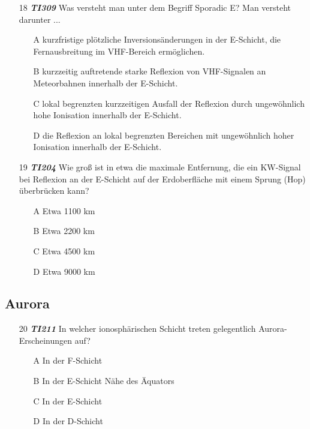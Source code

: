 \begin{enumerate} 
\itemsep1pt\parskip0pt
\item[18] \emph{\textbf{TI309}}   Was versteht man unter dem Begriff Sporadic E? Man versteht darunter ...
	\begin{enumerate}
	\itemsep1pt\parskip0pt
		\item[A] kurzfristige plötzliche Inversionsänderungen in der E-Schicht, die Fernausbreitung im VHF-Bereich ermöglichen.
		\item[B] kurzzeitig auftretende starke Reflexion von VHF-Signalen an Meteorbahnen innerhalb der E-Schicht.
		\item[C] lokal begrenzten kurzzeitigen Ausfall der Reflexion durch ungewöhnlich hohe Ionisation innerhalb der E-Schicht.
		\item[D] die Reflexion an lokal begrenzten Bereichen mit ungewöhnlich hoher Ionisation innerhalb der E-Schicht.
	\end{enumerate}
\end{enumerate}

\begin{enumerate} 
\itemsep1pt\parskip0pt
\item[19] \emph{\textbf{TI204}}  Wie groß ist in etwa die maximale Entfernung, die ein KW-Signal bei Reflexion an der E-Schicht auf der Erdoberfläche mit einem Sprung (Hop) überbrücken kann?
	\begin{enumerate}
	\itemsep1pt\parskip0pt
		\item[A] Etwa 1100 km
		\item[B] Etwa 2200 km
		\item[C] Etwa 4500 km
		\item[D] Etwa 9000 km
	\end{enumerate}
\end{enumerate}

\subsection*{Aurora}

\begin{enumerate} 
\itemsep1pt\parskip0pt
\item[20] \emph{\textbf{TI211}}   In welcher ionosphärischen Schicht treten gelegentlich Aurora-Erscheinungen auf?
	\begin{enumerate}
	\itemsep1pt\parskip0pt
		\item[A] In der F-Schicht
		\item[B] In der E-Schicht Nähe des Äquators
		\item[C] In der E-Schicht
		\item[D] In der D-Schicht
	\end{enumerate}
\end{enumerate}

